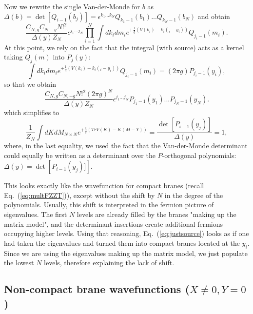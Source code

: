 \documentclass[english]{article}
\begin{document}
Now we rewrite the single Van-der-Monde for $b$ as $\Delta(b)=\det\left[ Q_{i-1}(b_{j})\right] = \epsilon^{k_{1}...k_{N}} Q_{k_{1}-1}(b_1)...  Q_{k_{N}-1}(b_N)$ and obtain
\begin{equation}
     \frac{C_{N,g}C_{N,-g}N!^2}{\Delta(y)Z_{N}} \epsilon^{j_{1}...j_{N}} \prod_{i=1}^{N} \int dk_{i} dm_{i} e^{+\frac{1}{g}\left( V(k_{i}) - k_{i}(_{i}-y_{i}) \right)} Q_{j_{i}-1}(m_{i}).
\end{equation}
At this point, we rely on the fact that the integral (with source) acts as a kernel taking $Q_{j}(m)$ into $P_{j}(y)$:
\begin{equation}
\int dk_{i} dm_{i} e^{+\frac{1}{g}\left( V(k_{i}) - k_{i}(_{i}-y_{i}) \right)} Q_{j_{i}-1}(m_{i}) = (2\pi g) P_{j_{i}-1}(y_{i}),
\end{equation}
so that we obtain 
\begin{equation}
     \frac{C_{N,g}C_{N,-g}N!^2 (2\pi g)^N}{\Delta(y)Z_{N}} \epsilon^{j_{1}...j_{N}} P_{j_{1}-1}(y_{1})...P_{j_{N}-1}(y_{N}).  
\end{equation}
which simplifies to
\begin{equation}
 \boxed{\frac{1}{Z_{N}}\int dK dM_{N \times N} e^{+ \frac{1}{g} \left( Tr V(K) - K(M-Y) \right)} = \frac{\det \left[  P_{i-1}(y_{j})\right]}{\Delta(y)} = 1,}
 \end{equation}
 where, in the last equality, we used the fact that the Van-der-Monde determinant could equally be written as a determinant over the $P$-orthogonal polynomials:  $\Delta(y)=\det\left[P_{i-1}(y_{j})]\right]$. 

This looks exactly like the wavefunction for compact branes (recall Eq.~(\ref{eq:multFZZT})), except without the shift by $N$ in the degree of the polynomials. Usually, this shift is interpreted in the fermion picture of eigenvalues. The first $N$ levels are already filled by the branes "making up the matrix model", and the determinant insertions create additional fermions occupying higher levels. Using that reasoning, Eq.~(\ref{eq:justsource}) looks as if one had taken the eigenvalues and turned them into compact branes located at the $y_i$. Since we are using the eigenvalues making up the matrix model, we just populate the lowest $N$ levels, therefore explaining the lack of shift.   



\subsection{Non-compact brane wavefunctions ($X \neq 0, Y=0$)} \label{sec:dualfzztcalcs}
\end{document}
